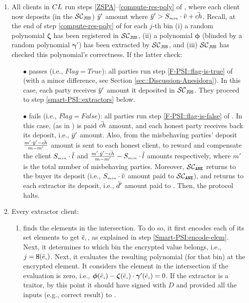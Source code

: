 \begin{enumerate}
\item\label{e-psi::invoke-remainer-F-PSI} All clients in ${CL}$   run steps \ref{ZSPA}--\ref{compute-res-poly} of \fpsi, where each client now deposits (in the $\mathcal{SC}_{\mathtt{JUS}}$) $\ddot{y}'$ amount where $\ddot{y}'>S_{\scriptscriptstyle min}\cdot \ddot{v}+{\ddot{ch}}$. Recall, at the end of step \ref{compute-res-poly}  of \fpsi for each $j$-th bin (i) a random polynomial $\bm\zeta$ has been registered in $\mathcal{SC}_{\mathtt{JUS}}$, (ii) a polynomial $\bm\phi$ (blinded by a random polynomial $\bm\gamma'$) has been extracted by $\mathcal{SC}_{\mathtt{JUS}}$, and (iii) $\mathcal{SC}_{\mathtt{JUS}}$  has checked this polynomial's  correctness. If the latter check:

\begin{itemize}
\item[$\bullet$] passes (i.e., $Flag=True$): all parties run step \ref{F-PSI::flag-is-true} of \fpsi (with a minor difference, see Section \ref{sec::Discussion-Anesidora}).  In this case, each party receives $\ddot{y}'$ amount it deposited in $\mathcal{SC}_{\mathtt{JUS}}$. They proceed to step \ref{smart-PSI::extractors} below.
\item[$\bullet$]  fails (i.e., $Flag=False$): all parties run step \ref{F-PSI::flag-is-false}  of \fpsi. In this case,
(as in \fpsi) \aud is paid $\ddot{ch}$ amount, and each honest party receives back its deposit, i.e., $\ddot{y}'$ amount. Also,  from the misbehaving parties' deposit  $\frac{m'\cdot \ddot{y}'-\ddot{ch}}{m-m'}$ amount is sent to each honest client,  to reward and compensate the client $S_{\scriptscriptstyle min}\cdot \ddot{l}$ and $\frac{m'\cdot \ddot{y}'-\ddot{ch}}{m-m'}- S_{\scriptscriptstyle min}\cdot \ddot{l}$ amounts respectively, where $m'$ is the total number of misbehaving parties.  Moreover, $\mathcal{SC}_{\mathtt{ANE}}$ returns to the buyer its deposit (i.e., $S_{\scriptscriptstyle min}\cdot \ddot{v}$ amount paid to $\mathcal{SC}_{\mathtt{ANE}}$), and returns to each extractor its deposit, i.e., $\ddot{d}'$ amount paid to \SCpc. Then, the protocol halts. 
\end{itemize}

\item\label{smart-PSI::extractors} Every extractor client: 
\begin{enumerate}

\item finds the elements in the intersection. To do so, it first encodes each of its set elements to get $\bar e_{\scriptscriptstyle i}$, as explained in step \ref{Smart-PSI:encode-elem}.  
%
 Next, it determines to which bin the encrypted value belongs, i.e., ${ {  {j}}}=\mathtt{H}( \bar{e}_{\scriptscriptstyle i})$. Next, it evaluates the resulting polynomial (for that bin) at the encrypted element. It considers the element in the intersection if the evaluation is zero, i.e., $\bm\phi( \bar{e}_{\scriptscriptstyle i})-\bm\zeta( \bar{e}_{\scriptscriptstyle i})\cdot \bm\gamma'( \bar{e}_{\scriptscriptstyle i})=0$. If the extractor is a traitor, by this point it should have signed \SCtc with $ { D}$ and provided all the inputs (e.g., correct result) to \SCtc. 


\end{enumerate}
\end{enumerate}
